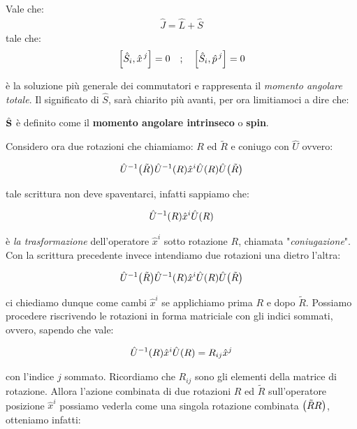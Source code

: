 \begin{mydef}
	Vale che:
\begin{align*}
	\hat{J} = \hat{L} + \hat{S}
\end{align*}
	tale che:	
\begin{align*}
	\qty[\hat{S}_i, \hat{x}^{\, j}] = 0 \quad ; \quad \qty[\hat{S}_i, \hat{p}^{\, j}] = 0
\end{align*}
\end{mydef}

	è la soluzione più generale dei  commutatori e rappresenta il \textit{momento angolare totale}. Il significato di $\hat{S}$, sarà chiarito più avanti, per ora limitiamoci a dire che:
	
\begin{mydef}
	$\hat{\vb{S}}$ è definito come il \textbf{momento angolare intrinseco} o \textbf{spin}.
\end{mydef}


	Considero ora due rotazioni che chiamiamo: $R$ ed $\tilde{R}$ e coniugo con $\hat{U}$ ovvero:
	
\begin{align*}
	\hat{U}^{-1}\qty(\tilde{R})\hat{U}^{-1}\qty(R)\hat{x}^i\hat{U}\qty(R)\hat{U}\qty(\tilde{R})
\end{align*}

	tale scrittura non deve spaventarci, infatti sappiamo che:
	
\begin{align*}
	\hat{U}^{-1}\qty(R)\hat{x}^i\hat{U}\qty(R)
\end{align*}

	è \textit{la trasformazione} dell'operatore $\hat{x}^i$ sotto rotazione $R$, chiamata "\textit{coniugazione}". Con la scrittura precedente invece intendiamo due rotazioni una dietro l'altra:
	
\begin{align*}
	\hat{U}^{-1}\qty(\tilde{R})\hat{U}^{-1}\qty(R)\hat{x}^i\hat{U}\qty(R)\hat{U}\qty(\tilde{R})
\end{align*}

	ci chiediamo dunque come cambi $\hat{x}^{i}$ se applichiamo prima $R$ e dopo $\tilde{R}$. Possiamo procedere riscrivendo le rotazioni in forma matriciale con gli indici sommati, ovvero, sapendo che vale:

\begin{align*}
	\hat{U}^{-1}\qty(R)\hat{x}^i\hat{U}\qty(R) = R_{ij} \hat{x}^{j}
\end{align*}

	con l'indice $j$ sommato. Ricordiamo che $R_{ij}$ sono gli elementi della matrice di rotazione. Allora l'azione combinata di due rotazioni $R$ ed $\tilde{R}$ sull'operatore posizione $\hat{x}^i$ possiamo vederla come una singola rotazione combinata $\qty(\tilde{R}R)$, otteniamo infatti:
	
